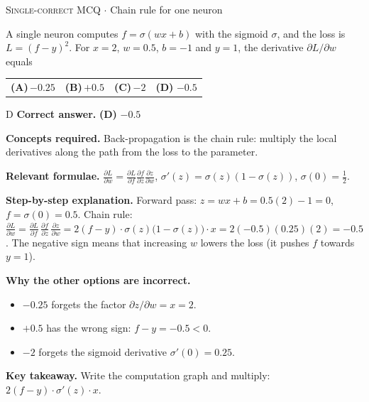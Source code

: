 \documentclass[11pt,a4paper]{article}
\newcommand{\optlabel}[1]{\textbf{(#1)}}
\newcommand{\correctlabel}[1]{\textcolor{okgreen}{\textbf{(#1)}\,\ding{51}}}
\newenvironment{qitem}[1]{\begin{list}{}{\setlength{\leftmargin}{3.3em}\setlength{\labelwidth}{3.1em}%
  \setlength{\labelsep}{0.2em}\setlength{\topsep}{3pt}\setlength{\parsep}{3pt}}\item[\textbf{Q.#1}\hfill]}{\end{list}}
\newcommand{\qsep}{\par\vspace{2pt}{\color{black!15}\hrule}\vspace{4pt}}
\newcommand{\qmeta}[2]{{\footnotesize\color{black!60}\textsc{#1} \;$\cdot$\; #2}\par}
\begin{document}
\begin{qitem}{6}
\qmeta{Single-correct MCQ}{Chain rule for one neuron}
A single neuron computes $f = \sigma(wx + b)$ with the sigmoid $\sigma$, and the loss is $L = (f - y)^2$.
For $x = 2$, $w = 0.5$, $b = -1$ and $y = 1$, the derivative $\partial L/\partial w$ equals
\par\smallskip\noindent\begin{tabularx}{\linewidth}{@{}*{4}{L}@{}}
\optlabel{A}\,$-0.25$ & \optlabel{B}\,$+0.5$ & \optlabel{C}\,$-2$ & \correctlabel{D}\,$-0.5$
\end{tabularx}
\end{qitem}
\begin{solbox}{D}
\textbf{\color{brand}Correct answer.} \textcolor{okgreen}{\textbf{(D)}} $-0.5$

\textbf{\color{brand}Concepts required.} Back-propagation is the chain rule: multiply the local derivatives along the path from the loss to the parameter.

\textbf{\color{brand}Relevant formulae.} $\frac{\partial L}{\partial w} = \frac{\partial L}{\partial f}\frac{\partial f}{\partial z}\frac{\partial z}{\partial w}$, $\sigma'(z) = \sigma(z)(1 - \sigma(z))$, $\sigma(0) = \frac12$.

\textbf{\color{brand}Step-by-step explanation.} Forward pass: $z = wx + b = 0.5(2) - 1 = 0$, $f = \sigma(0) = 0.5$.
Chain rule: $\frac{\partial L}{\partial w} = \frac{\partial L}{\partial f}\,\frac{\partial f}{\partial z}\,\frac{\partial z}{\partial w}
= 2(f - y)\cdot\sigma(z)\big(1-\sigma(z)\big)\cdot x = 2(-0.5)(0.25)(2) = -0.5$.
The negative sign means that increasing $w$ lowers the loss (it pushes $f$ towards $y = 1$).

\textbf{\color{brand}Why the other options are incorrect.}
\begin{itemize}[leftmargin=2.4em, itemsep=1pt, topsep=2pt]
\item[\textbf{(A)}] $-0.25$ forgets the factor $\partial z/\partial w = x = 2$.
\item[\textbf{(B)}] $+0.5$ has the wrong sign: $f - y = -0.5 < 0$.
\item[\textbf{(C)}] $-2$ forgets the sigmoid derivative $\sigma'(0) = 0.25$.
\end{itemize}
\textbf{\color{brand}Key takeaway.} Write the computation graph and multiply: $2(f - y)\cdot\sigma'(z)\cdot x$.
\end{solbox}
\qsep
\end{document}
